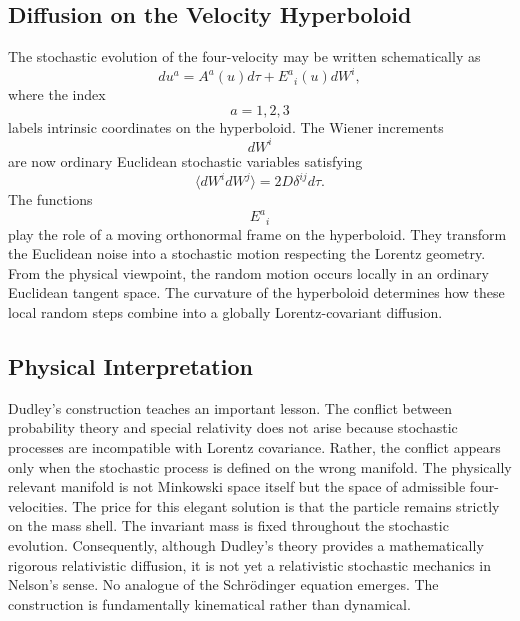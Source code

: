 \subsection{Diffusion on the Velocity Hyperboloid}
The stochastic evolution of the four-velocity may be written
schematically as
\begin{equation}
du^a=A^a(u)d\tau+E^a{}_i(u)dW^i ,
\label{eq:DudleySDE}
\end{equation}
where the index
\[a=1,2,3\]
labels intrinsic coordinates on the hyperboloid.
The Wiener increments
\[dW^i\]
are now ordinary Euclidean stochastic variables satisfying
\begin{equation}
\langle dW^i dW^j\rangle=2D\delta^{ij}d\tau .
\end{equation}
The functions
\[E^a{}_i\]
play the role of a moving orthonormal frame on the hyperboloid.
They transform the Euclidean noise into a stochastic motion respecting
the Lorentz geometry.
From the physical viewpoint,
the random motion occurs locally in an ordinary Euclidean tangent space.
The curvature of the hyperboloid determines how these local random steps
combine into a globally Lorentz-covariant diffusion.
\subsection{Physical Interpretation}
Dudley's construction teaches an important lesson.
The conflict between probability theory and special relativity does not
arise because stochastic processes are incompatible with Lorentz
covariance.
Rather, the conflict appears only when the stochastic process is defined
on the wrong manifold.
The physically relevant manifold is not Minkowski space itself but the
space of admissible four-velocities.
The price for this elegant solution is that the particle remains
strictly on the mass shell.
The invariant mass is fixed throughout the stochastic evolution.
Consequently,
although Dudley's theory provides a mathematically rigorous relativistic
diffusion,
it is not yet a relativistic stochastic mechanics in Nelson's sense.
No analogue of the Schrödinger equation emerges.
The construction is fundamentally kinematical rather than dynamical.
